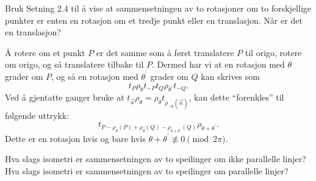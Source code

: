 \documentclass[11pt, norsk]{article}
\begin{document}
\begin{oppg}
Bruk Setning 2.4 til å vise at sammensetningen av to rotasjoner om to forskjellige punkter er enten en rotasjon om et tredje punkt eller en translasjon. Når er det en translasjon?  
\end{oppg}
\begin{losn}
Å rotere om et punkt $P$ er det samme som å først translatere $P$ til origo, rotere om origo, og så translatere tilbake til $P$. Dermed har vi at en rotasjon med $\theta$ grader om $P$, og så en rotasjon med $\theta^\prime$ grader om $Q$ kan skrives som
$$
t_P \rho_\theta t_{-P} t_Q \rho_{\theta^\prime} t_{-Q}.
$$
Ved å  gjentatte ganger bruke at $t_{\vec a} \rho_{\theta} = \rho_{\theta} t_{\rho_{-\theta}(\vec a)}$, kan dette ``forenkles'' til følgende uttrykk: 
$$
t_{P-\rho_\theta(P)+\rho_\theta(Q)-\rho_{\theta+\theta^\prime}(Q)} \rho_{\theta+\theta^\prime}.
$$
Dette er en rotasjon hvis og bare hvis $\theta+\theta^\prime \not \equiv 0 \pmod {2\pi}$.
\end{losn}


\begin{oppg}
Hva slags isometri er sammensetningen av to speilinger om ikke parallelle linjer? Hva slags isometri er sammensetningen av to speilinger om parallelle linjer?
\end{oppg}
\end{document}
